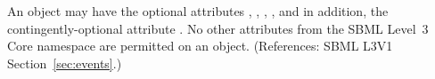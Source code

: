 An \Event object may have the optional attributes ,
, , , and in addition, the
contingently-optional attribute .  No other
attributes from the SBML Level~3 Core namespace are permitted on an \Event
object.  (References: SBML L3V1 Section~\ref{sec:events}.)
